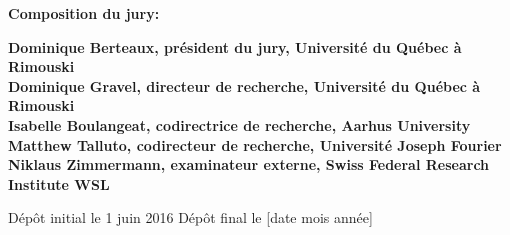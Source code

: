 \thispagestyle{empty}

\null
\vfill
\noindent \textbf{Composition du jury:}\\
\vspace{1cm}

\begin{singlespace}
  \noindent \textbf{Dominique Berteaux, président du jury, Université du Québec à Rimouski}\\

  \noindent \textbf{Dominique Gravel, directeur de recherche, Université du Québec à Rimouski}\\

  \noindent \textbf{Isabelle Boulangeat, codirectrice de recherche, Aarhus University}\\

  \noindent \textbf{Matthew Talluto, codirecteur de recherche, Université Joseph Fourier}\\

  \noindent \textbf{Niklaus Zimmermann, examinateur externe, Swiss Federal Research Institute WSL}\\
\end{singlespace}

\vspace{2cm}
\noindent Dépôt initial le 1 juin 2016
\hspace{3cm}
Dépôt final le [date mois année]


\cleardoublepage
